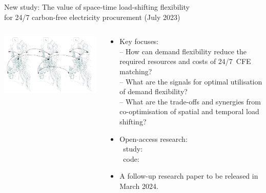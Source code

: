 


\begin{frame}{New study: The value of space-time load-shifting flexibility \\ 
  for 24/7 carbon-free electricity procurement (July 2023)}
  
    {\small
    \begin{columns}
    \begin{column}{9cm}
    \includegraphics[width=10cm]{images/spatial-temporal-vlinks-cropped.png}
    \end{column}
  
    \begin{column}{6cm}
  
    \begin{itemize}
      \vspace{-0.2cm}
       \item Key focuses: \\
     -- How can demand flexibility reduce the required \alert{resources} and \alert{costs} of 24/7~CFE matching?\\ 
     \vspace{0.1cm}
     -- What are the \alert{signals} for optimal utilisation of demand flexibility?\\
     \vspace{0.1cm}
     -- What are the trade-offs and synergies from co-optimisation of \alert{spatial} and \alert{temporal} load shifting?
  
     \item Open-access research: \\
     \vspace{0.2cm}
     {\footnotesize
     \faUnlock~study:
     \\
     \faUnlock~code:
     \\
     }

     \item  A follow-up research paper to be released in March 2024.
  
    \end{itemize}
    \end{column}
    \end{columns}
    }
  \end{frame}
  

